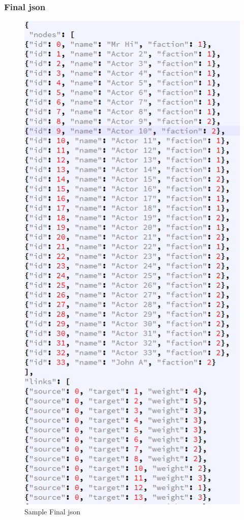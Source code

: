 \subsubsection{Final json}
\begin{figure}[ht]    
    \begin{center}
        \includegraphics[scale=0.6]{q3_sample_json.png}
        \caption{Sample Final json }
        \label{Sample3_t2}
    \end{center}
\end{figure}
\newpage

